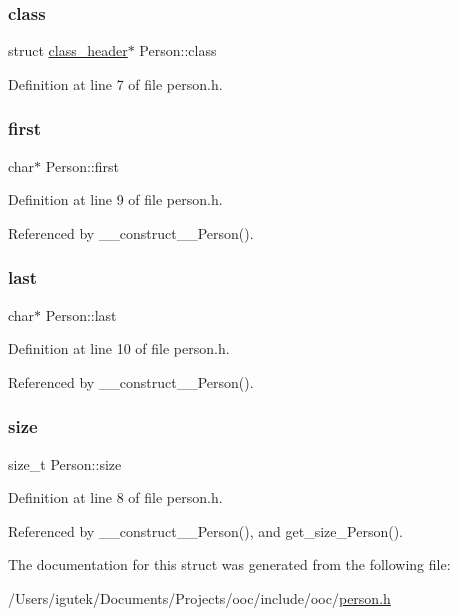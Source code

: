 \mbox{\label{structPerson_ac2d72607b366d6b5520a340b3deaced4}} 
\subsubsection{\texorpdfstring{class}{class}}
{\footnotesize\ttfamily struct \mbox{\hyperlink{structclass__header}{class\+\_\+header}}$\ast$ Person\+::class}



Definition at line 7 of file person.\+h.

\mbox{\label{structPerson_a38f2f16e85640e2f851e46319735dc2a}} 
\subsubsection{\texorpdfstring{first}{first}}
{\footnotesize\ttfamily char$\ast$ Person\+::first}



Definition at line 9 of file person.\+h.



Referenced by \+\_\+\+\_\+construct\+\_\+\+\_\+\+Person().

\mbox{\label{structPerson_a680212888ba741ce822803812588fbcf}} 
\subsubsection{\texorpdfstring{last}{last}}
{\footnotesize\ttfamily char$\ast$ Person\+::last}



Definition at line 10 of file person.\+h.



Referenced by \+\_\+\+\_\+construct\+\_\+\+\_\+\+Person().

\mbox{\label{structPerson_afcedcdc3dc5eba7d989eeaa55d236a11}} 
\subsubsection{\texorpdfstring{size}{size}}
{\footnotesize\ttfamily size\+\_\+t Person\+::size}



Definition at line 8 of file person.\+h.



Referenced by \+\_\+\+\_\+construct\+\_\+\+\_\+\+Person(), and get\+\_\+size\+\_\+\+Person().



The documentation for this struct was generated from the following file\+:\begin{DoxyCompactItemize}
\item 
/\+Users/igutek/\+Documents/\+Projects/ooc/include/ooc/\mbox{\hyperlink{person_8h}{person.\+h}}\end{DoxyCompactItemize}
